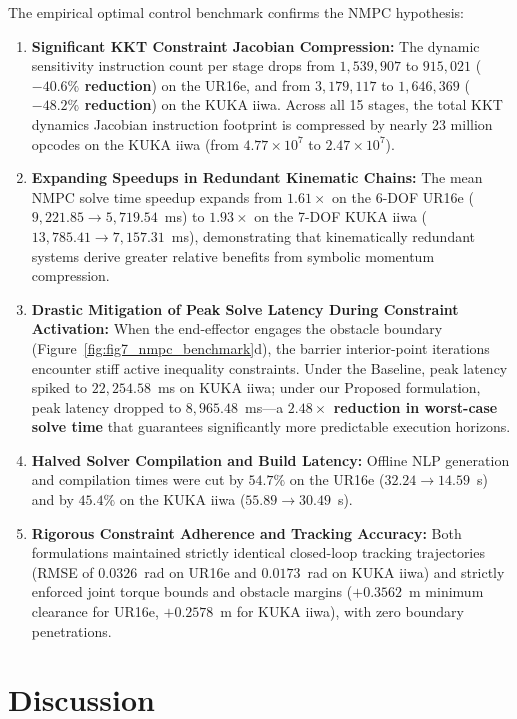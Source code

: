 \documentclass[fleqn,10pt]{article}
\begin{document}
	The empirical optimal control benchmark confirms the NMPC hypothesis:
	\begin{enumerate}
		\item \textbf{Significant KKT Constraint Jacobian Compression:} The dynamic sensitivity instruction count per stage drops from $1,539,907$ to $915,021$ (\textbf{$-40.6\%$ reduction}) on the UR16e, and from $3,179,117$ to $1,646,369$ (\textbf{$-48.2\%$ reduction}) on the KUKA iiwa. Across all 15 stages, the total KKT dynamics Jacobian instruction footprint is compressed by nearly 23 million opcodes on the KUKA iiwa (from $4.77 \times 10^7$ to $2.47 \times 10^7$).
		\item \textbf{Expanding Speedups in Redundant Kinematic Chains:} The mean NMPC solve time speedup expands from \textbf{$1.61\times$} on the 6-DOF UR16e ($9,221.85 \to 5,719.54$~ms) to \textbf{$1.93\times$} on the 7-DOF KUKA iiwa ($13,785.41 \to 7,157.31$~ms), demonstrating that kinematically redundant systems derive greater relative benefits from symbolic momentum compression.
		\item \textbf{Drastic Mitigation of Peak Solve Latency During Constraint Activation:} When the end-effector engages the obstacle boundary (Figure~\ref{fig:fig7_nmpc_benchmark}d), the barrier interior-point iterations encounter stiff active inequality constraints. Under the Baseline, peak latency spiked to $22,254.58$~ms on KUKA iiwa; under our Proposed formulation, peak latency dropped to $8,965.48$~ms---a \textbf{$2.48\times$ reduction in worst-case solve time} that guarantees significantly more predictable execution horizons.
		\item \textbf{Halved Solver Compilation and Build Latency:} Offline NLP generation and compilation times were cut by $54.7\%$ on the UR16e ($32.24 \to 14.59$~s) and by $45.4\%$ on the KUKA iiwa ($55.89 \to 30.49$~s).
		\item \textbf{Rigorous Constraint Adherence and Tracking Accuracy:} Both formulations maintained strictly identical closed-loop tracking trajectories (RMSE of $0.0326$~rad on UR16e and $0.0173$~rad on KUKA iiwa) and strictly enforced joint torque bounds and obstacle margins ($+0.3562$~m minimum clearance for UR16e, $+0.2578$~m for KUKA iiwa), with zero boundary penetrations.
	\end{enumerate}
	
	\section*{Discussion}
	
\end{document}
